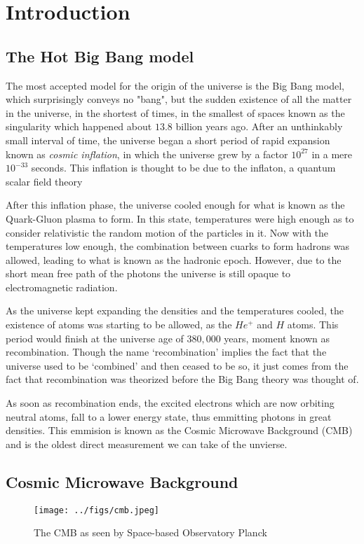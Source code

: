 \chapter{Introduction}

\section{The Hot Big Bang model}

The most accepted model for the origin of the universe is the Big Bang model, which surprisingly conveys no "bang", but the sudden existence of all the matter in the universe, in the shortest of times, in the smallest of spaces known as the singularity which happened about $13.8$ billion years ago. After an unthinkably small interval of time, the universe began a short period of rapid expansion known as \textit{cosmic inflation}, in which the universe grew by a factor $10^{27}$ in a mere $10^{-33}$ seconds. This inflation is thought to be due to the inflaton, a quantum scalar field theory

After this inflation phase, the universe cooled enough for what is known as the Quark-Gluon plasma to form. In this state, temperatures were high enough as to consider relativistic the random motion of the particles in it. Now with the temperatures low enough, the combination between cuarks to form hadrons was allowed, leading to what is known as the hadronic epoch. However, due to the short mean free path of the photons the universe is still opaque to electromagnetic radiation.

As the universe kept expanding the densities and the temperatures cooled, the existence of atoms was starting to be allowed, as the $He^{+}$ and $H$ atoms. This period would finish at the universe age of $380,000$ years, moment known as recombination. Though the name `recombination' implies the fact that the universe used to be `combined' and then ceased to be so, it just comes from the fact that recombination was theorized before the Big Bang theory was thought of.

As soon as recombination ends, the excited electrons which are now orbiting neutral atoms, fall to a lower energy state, thus emmitting photons in great densities. This emmision is known as the Cosmic Microwave Background (CMB) and is the oldest direct measurement we can take of the unvierse.


\section{Cosmic Microwave Background}
\begin{figure}[h]
	\centering
	\texttt{[image: ../figs/cmb.jpeg]}
	\caption{The CMB as seen by Space-based Observatory Planck\cite{Collaboration2018}}
	\label{fig:cmb}
\end{figure}

